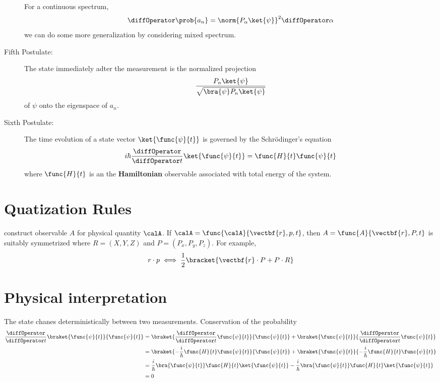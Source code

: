 \begin{description}
        For a continuous spectrum,
        \begin{equation*}
            \diffOperator \prob{a_n} = \norm{P_{\alpha} \ket{\psi}}^2 \diffOperator \alpha
        \end{equation*}
        we can do some more generalization by considering mixed spectrum.
    \item [Fifth Postulate: ] The state immediately adter the measurement is the normalized projection
          \begin{equation*}
              \frac{P_n \ket{\psi}}{\sqrt{\bra{\psi} P_n \ket{\psi}}}
          \end{equation*}
          of \(\psi\) onto the eigenspace of \(a_n\).
    \item [Sixth Postulate:] The time evolution of a state vector \(\ket{\func{\psi}{t}}\) is governed by the Schr\"{o}dinger's equation
          \begin{equation*}
              i\hbar \dfrac{\diffOperator}{\diffOperator t} \ket{\func{\psi}{t}} = \func{H}{t} \func{\psi}{t}
          \end{equation*}
          where \(\func{H}{t}\) is an the \textbf{Hamiltonian} observable associated with total energy of the system.
\end{description}
\section{Quatization Rules}
construct observable \(A\) for physical quantity \(\calA\). If \(\calA = \func{\calA}{\vectbf{r},p,t}\), then \(A = \func{A}{\vectbf{r},P,t}\) is suitably symmetrized where \(R = (X,Y,Z)\) and \(P = (P_x, P_y, P_z)\). For example,
\begin{equation*}
    r\cdot p  \iff \frac{1}{2}\bracket{\vectbf{r} \cdot P + P \cdot R}
\end{equation*}
\section{Physical interpretation}
The state chanes deterministically between two measurements. Conservation of the probability
\begin{align*}
    \frac{\diffOperator }{\diffOperator t} \braket{\func{\psi}{t}}{\func{\psi}{t}} & =  \braket{\frac{\diffOperator }{\diffOperator t} \func{\psi}{t}}{\func{\psi}{t}} +  \braket{\func{\psi}{t}}{\frac{\diffOperator }{\diffOperator t} \func{\psi}{t}} \\
                                                                                   & = \braket{-\frac{i}{\hbar} \func{H}{t} \func{\psi}{t}}{\func{\psi}{t}} + \braket{\func{\psi}{t}}{-\frac{i}{\hbar} \func{H}{t} \func{\psi}{t}}                       \\
                                                                                   & = \frac{i}{\hbar} \bra{\func{\psi}{t}} \func{H}{t} \ket{\func{\psi}{t}} - \frac{i}{\hbar} \bra{\func{\psi}{t}} \func{H}{t} \ket{\func{\psi}{t}}                     \\
                                                                                   & = 0
\end{align*}
